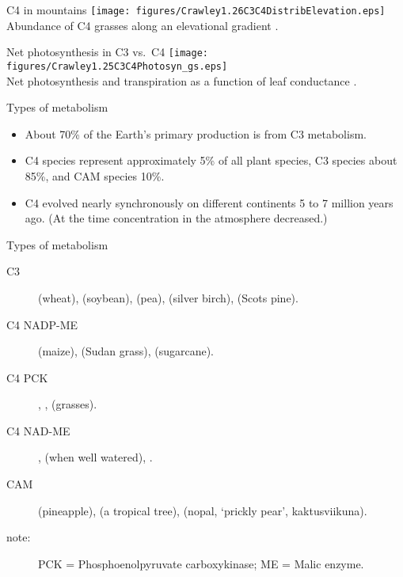 \documentclass[10pt]{beamer}
\begin{document}
\begin{frame}{C4 in mountains}
    \centering
    \texttt{[image: figures/Crawley1.26C3C4DistribElevation.eps]}\\

    {\small Abundance of C4 grasses along an elevational gradient \autocite[from][]{Crawley1997}.}
\end{frame}

\begin{frame}{Net photosynthesis in C3 vs.\ C4}
    \centering
    \texttt{[image: figures/Crawley1.25C3C4Photosyn\_gs.eps]}\\

    {\small Net photosynthesis and transpiration as a function of leaf conductance
     \autocite[from][]{Crawley1997}.}
\end{frame}

\begin{frame}{Types of metabolism}
    \begin{itemize}
        \item About 70\% of the Earth's primary production is
        from C3 metabolism.
        \item C4 species represent approximately 5\% of all plant
        species, C3 species about 85\%, and CAM species 10\%.
        \item C4 evolved nearly synchronously on different
        continents 5 to 7 million years ago. (At the time \COtwo
        concentration in the atmosphere decreased.)
    \end{itemize}
\end{frame}

\begin{frame}{Types of metabolism}
    \begin{description}
        \item[C3]  (wheat),  (soybean),
         (pea),  (silver birch),
         (Scots pine).
        \item[C4 NADP-ME]  (maize),  (Sudan grass),  (sugarcane).
        \item[C4 PCK] , ,
         (grasses).
        \item[C4 NAD-ME] ,  (when well watered), .
        \item[CAM]  (pineapple),
         (a tropical tree),  (nopal, `prickly pear', kaktusviikuna).
        \item[note:] PCK = Phosphoenolpyruvate carboxykinase; ME = Malic enzyme.
        \end{description}
\end{frame}
\end{document}
